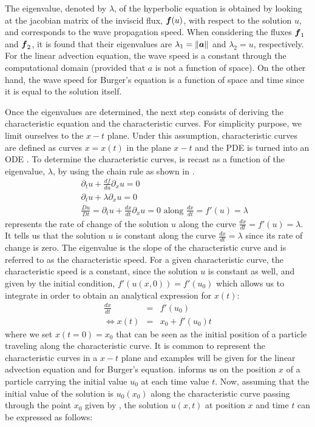 The eigenvalue, denoted by $\lambda$, of the hyperbolic equation is obtained by looking at the jacobian matrix of the inviscid flux, $\boldsymbol f(u)$, with respect to the solution $u$, and corresponds to the wave propagation speed. When considering the fluxes $\boldsymbol f_1$ and $\boldsymbol f_2$, it is found that their eigenvalues are $\lambda_1 = \|\boldsymbol a\|$ and $\lambda_2 = u$, respectively. For the linear advection equation, the wave speed is a constant through the computational domain (provided that $a$ is not a function of space). On the other hand, the wave speed for Burger's equation is a function of space and time since it is equal to the solution itself.

Once the eigenvalues are determined, the next step consists of deriving the characteristic equation and the characteristic curves. For simplicity purpose, we limit ourselves to the $x-t$ plane. Under this assumption, characteristic curves are defined as curves $x = x(t)$ in the plane $x-t$ and the PDE is turned into an ODE \cite{Toro}. To determine the characteristic curves,  is recast as a function of the eigenvalue, $\lambda$, by using the chain rule as shown in .
%
\begin{eqnarray}\label{eq:ivp3_sct1b}
&&\partial_t u + \frac{df}{du}\partial_x u = 0 \nonumber\\
&&\partial_t u + \lambda \partial_x u = 0 \nonumber \\
&&\frac{Du}{Dt} = \partial_t u + \frac{dx}{dt} \partial_x u = 0 \text{ along } \frac{dx}{dt} = f'(u) = \lambda 
\end{eqnarray}
%
 represents the rate of change of the solution $u$ along the curve $\frac{dx}{dt} = f'(u) = \lambda$. It tells us that the solution $u$ is constant along the curve $\frac{dx}{dt} = \lambda$ since its rate of change is zero. The eigenvalue is the slope of the characteristic curve and is referred to as the characteristic speed. 
For a given characteristic curve, the characteristic speed is a constant, since the solution $u$ is constant as well, and given by the initial condition, $f'(u(x,0))=f'(u_0)$ which allows us to integrate in order to obtain an analytical expression for $x(t)$:
%
\begin{eqnarray}\label{eq:ivp4_sct1b}
\frac{dx}{dt} &=& f'(u_0) \nonumber \\
\Leftrightarrow x(t) &=& x_0 + f'(u_0)t
\end{eqnarray}
%
where we set $x(t=0) = x_0$ that can be seen as the initial position of a particle traveling along the characteristic curve. It is common to represent the characteristic curves in a $x-t$ plane and examples will be given for the linear advection equation and for Burger's equation.  informs us on the position $x$ of a particle carrying the initial value $u_0$ at each time value $t$. Now, assuming that the initial value of the solution is $u_0(x_0)$ along the characteristic curve passing through the point $x_0$ given by , the solution $u(x,t)$ at position $x$ and time $t$ can be expressed as follows:
